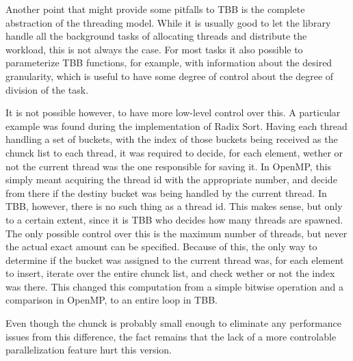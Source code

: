 Another point that might provide some pitfalls to TBB is the complete abstraction of the threading model. While it is usually good to let the library handle all the background tasks of allocating threads and distribute the workload, this is not always the case. For most tasks it also possible to parameterize TBB functions, for example, with information about the desired granularity, which is useful to have some degree of control about the degree of division of the task.

It is not possible however, to have more low-level control over this. A particular example was found during the implementation of Radix Sort. Having each thread handling a set of buckets, with the index of those buckets being received as the chunck list to each thread, it was required to decide, for each element, wether or not the current thread was the one responsible for saving it. In OpenMP, this simply meant acquiring the thread id with the appropriate number, and decide from there if the destiny bucket was being handled by the current thread.
In TBB, however, there is no such thing as a thread id. This makes sense, but only to a certain extent, since it is TBB who decides how many threads are spawned. The only possible control over this is the maximum number of threads, but never the actual exact amount can be specified.
Because of this, the only way to determine if the bucket was assigned to the current thread was, for each element to insert, iterate over the entire chunck list, and check wether or not the index was there. This changed this computation from a simple bitwise operation and a comparison in OpenMP, to an entire loop in TBB.

Even though the chunck is probably small enough to eliminate any performance issues from this difference, the fact remains that the lack of a more controlable parallelization feature hurt this version.